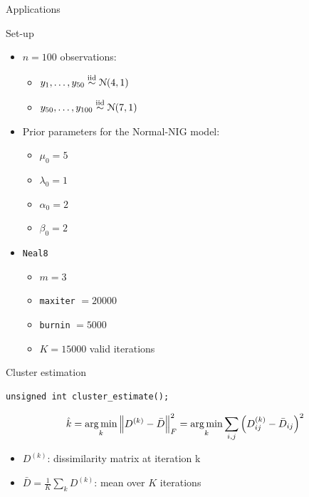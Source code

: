 \begin{frame}[c]
	\begin{center}
		\huge \color{blue} Applications
	\end{center}
\end{frame}

\begin{frame}[fragile]{Set-up}
\begin{itemize}
\item $n=100$ observations:
	\begin{itemize}
	\item $y_1,\dots, y_{50} \stackrel{\text{iid}}{\sim} \mathcal N(4,1)$
	\item $y_{50}, \dots, y_{100} \stackrel{\text{iid}}{\sim} \mathcal N(7,1)$
	\end{itemize}
\item Prior parameters for the Normal-NIG model:
	\begin{itemize}
	\item $\mu_0 = 5$ 
	\item $\lambda_0 = 1$
	\item $\alpha_0 = 2$
	\item $\beta_0 = 2$
	\end{itemize}

\item \verb|Neal8|
	\begin{itemize}
	\item $m=3$ 
	\item \verb|maxiter| $=20000$
	\item \verb|burnin| $=5000$
	\item $K=15000$ valid iterations
	\end{itemize}
\end{itemize}
\end{frame}

\begin{frame}[fragile]{Cluster estimation}


\begin{verbatim}
unsigned int cluster_estimate();
\end{verbatim}

$$ \hat{k} = \operatorname*{arg\,min}_k \left \lVert D^{(k)} - \bar D \right\rVert_F^2= \operatorname*{arg\,min}_k \sum_{i,j} \left( D^{(k)}_{ij} - \bar{D}_{ij}  \right)^2$$


\begin{itemize}

\item $D^{(k)}$: dissimilarity matrix  at iteration k \\

\item $\bar D= \frac{1}{K} \sum_k D^{(k)} $: mean over $K$ iterations
\end{itemize}

\end{frame}

